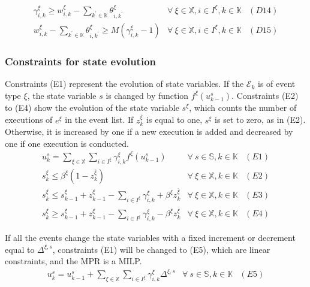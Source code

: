 \documentclass[]{interact}
\theoremstyle{plain}%
\theoremstyle{definition}
\theoremstyle{remark}
\begin{document}
\begin{eqnarray}
\gamma^{\xi}_{i,k} \ge w^{\xi}_{i,k} - \sum_{k^{'}\in \mathbb{K}}\theta^{\xi}_{i,k^{'}}&\forall\ \xi\in \mathbb{X},i\in I^{\xi},k\in \mathbb{K}&(D14)\nonumber\\
w^{\xi}_{i,k} - \sum_{k^{'}\in \mathbb{K}}\theta^{\xi}_{i,k^{'}} \ge M(\gamma^{\xi}_{i,k}-1) &\forall\ \xi\in \mathbb{X},i\in I^{\xi},k\in \mathbb{K}&(D15)\nonumber
\end{eqnarray}



\subsubsection{Constraints  for  state evolution}
Constraints (E1) represent the evolution of state variables. If the $\mathcal{E}_{k}$ is of event type $\xi$, the state variable $s$ is changed by function $f^{\xi}(u^s_{k-1})$. Constraints (E2) to (E4) show the evolution of the state variable $s^{\xi}$, which counts the number of executions of $e^{\xi}$ in the event list. If $z^{\bar{\xi}}_k$ is equal to one, $s^{\xi}$ is set to zero, as in (E2). Otherwise, it is increased by one if a new execution is added and decreased by one if one execution is conducted.
\begin{eqnarray}
u^{s}_{k} =  \sum_{\xi\in \mathbb{X}} \sum_{i\in I^{\xi}} \gamma^{\xi}_{i,k} f^{\xi}(u^s_{k-1})& \forall\ s\in \mathbb{S},k\in \mathbb{K}&(E1)\nonumber\\
s^{\xi}_{k}\le \beta^{\xi}(1-z^{\bar{\xi}}_k) & \forall\ \xi\in\mathbb{X},k\in \mathbb{K}&(E2)\nonumber\\
s^{\xi}_{k}\le s^{\xi}_{k-1} + z^{\xi}_{k-1} - \sum_{i\in I^{\xi}} \gamma^{\xi}_{i,k} + \beta^{\xi}z^{\bar{\xi}}_k& \forall\ \xi\in\mathbb{X},k\in \mathbb{K}&(E3)\nonumber\\
s^{\xi}_{k}\ge s^{\xi}_{k-1} + z^{\xi}_{k-1} - \sum_{i\in I^{\xi}} \gamma^{\xi}_{i,k} - \beta^{\xi}z^{\bar{\xi}}_k& \forall\ \xi\in\mathbb{X},k\in \mathbb{K}&(E4)\nonumber
\end{eqnarray}

If all the events change the state variables with a fixed increment or decrement equal to $\Delta^{\xi,s}$, constraints (E1) will be changed to (E5), which are linear constraints, and the MPR is a MILP. 
 \begin{eqnarray}
 u^{s}_{k} = u^s_{k-1} + \sum_{\xi\in \mathbb{X}} \sum_{i\in I^{\xi}} \gamma^{\xi}_{i,k} \Delta^{\xi,s}& \forall\ s\in \mathbb{S},k\in \mathbb{K}&(E5)\nonumber
 \end{eqnarray}
 
\end{document}
